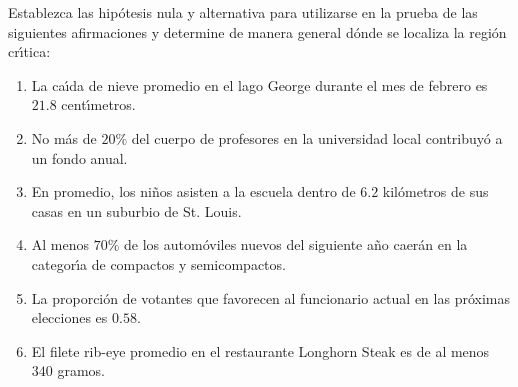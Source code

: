 \begin{enunciado}
 Establezca las hip\'otesis nula y alternativa para utilizarse en la prueba de las siguientes afirmaciones y determine de manera general d\'onde se localiza la regi\'on cr\'{\i}tica:
 \begin{enumerate}
  \item La ca\'{\i}da de nieve promedio en el lago George durante el mes de febrero es $21.8$ cent\'{\i}metros.
  \item No m\'as de $20\%$ del cuerpo de profesores en la universidad local contribuy\'o a un fondo anual.
  \item En promedio, los ni\~nos asisten a la escuela dentro de $6.2$ kil\'ometros de sus casas en un suburbio de St. Louis.
  \item Al menos $70\%$ de los autom\'oviles nuevos del siguiente a\~no caer\'an en la categor\'{\i}a de compactos y semicompactos.
  \item La proporci\'on de votantes que favorecen al funcionario actual en las pr\'oximas elecciones es $0.58$.
  \item El filete rib-eye promedio en el restaurante Longhorn Steak es de al menos $340$ gramos.
 \end{enumerate}
\end{enunciado}

